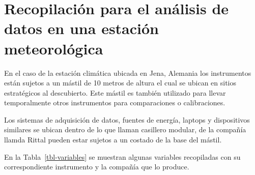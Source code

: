 \documentclass[
  us-letterpaper,
]{scrreprt}
\theoremstyle{plain}
\theoremstyle{definition}
\theoremstyle{definition}
\theoremstyle{remark}
\begin{document}
\section{Recopilación para el análisis de datos en una estación
meteorológica}\label{recopilaciuxf3n-para-el-anuxe1lisis-de-datos-en-una-estaciuxf3n-meteoroluxf3gica}

En el caso de la estación climática ubicada en Jena, Alemania los
instrumentos están sujetos a un mástil de 10 metros de altura el cual se
ubican en sitios estratégicos al descubierto. Este mástil es también
utilizado para llevar temporalmente otros instrumentos para
comparaciones o calibraciones.

Los sistemas de adquisición de datos, fuentes de energía, laptops y
dispositivos similares se ubican dentro de lo que llaman casillero
modular, de la compañía llamda Rittal pueden estar sujetos a un costado
de la base del mástil.

En la Tabla~\ref{tbl-variables} se muestran algunas variables
recopiladas con su correspondiente instrumento y la compañía que lo
produce.
\end{document}
